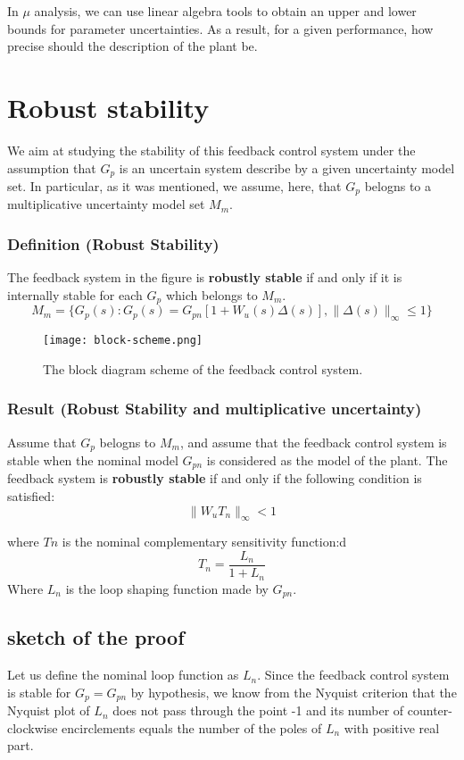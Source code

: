 \begin{QandAbox}
In $\mu$ analysis, we can use linear algebra tools to obtain an upper and lower bounds for parameter uncertainties. As a result, for a given performance, how precise should the description of the plant be.
\end{QandAbox}
\section{Robust stability}
We aim at studying the stability of this feedback control system under the assumption that $G_p$ is an uncertain system describe by a given uncertainty model set. In particular, as it was mentioned, we assume, here, that $G_p$ belogns to a multiplicative uncertainty model set $M_m$.

\subsubsection{Definition (Robust Stability)}
The feedback system in the figure is \textbf{robustly stable} if and only if it is internally stable for each $G_p$ which belongs to $M_m$.
\[
M_m = \{G_p(s): G_p(s) = G_{pn}[1+W_u(s)\Delta(s)],\|\Delta(s)\|_\infty \leq 1\}
\]
\begin{figure}[H]
    \centering
    \texttt{[image: block-scheme.png]}
    \caption{The block diagram scheme of the feedback control system.}
\end{figure}

\subsubsection{Result (Robust Stability and multiplicative uncertainty)}
Assume that $G_p$ belogns to $M_m$, and assume that the feedback control system is stable when the nominal model $G_{pn}$ is considered as the model of the plant. The feedback system is \textbf{robustly stable} if and only if the following condition is satisfied:
\[
\|W_uT_n\|_\infty < 1
\]

where $Tn$ is the nominal complementary sensitivity function:d
\[
T_n = \frac{L_n}{1 + L_n}
\]
Where $L_n$ is the loop shaping function made by $G_{pn}$.


\subsection{sketch of the proof}
Let us define the nominal loop function as $L_n$. Since the feedback control system is stable for $G_p = G_{pn}$ by hypothesis, we know from the Nyquist criterion that the Nyquist plot of $L_n$ does not pass through the point -1 and its number of counter-clockwise encirclements equals the number of the poles of $L_n$ with positive real part.

